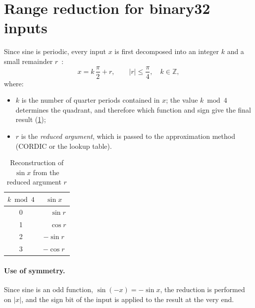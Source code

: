 \section{Range reduction for binary32 inputs}
\label{sec:range-reduction}

Since sine is periodic, every input $x$ is first decomposed into an integer
$k$ and a small remainder $r$~\cite{ly2026payne}:
\begin{equation}
  x = k\,\frac{\pi}{2} + r, \qquad |r| \le \frac{\pi}{4}, \quad k \in \mathbb{Z},
  \label{eq:sin-reduction}
\end{equation}
where:
\begin{itemize}
  \item $k$ is the number of quarter periods contained in $x$; the value
    $k \bmod 4$ determines the quadrant, and therefore which function and
    sign give the final result (\cref{tab:quadrant});
  \item $r$ is the \emph{reduced argument}, which is passed to the
    approximation method (CORDIC or the lookup table).
\end{itemize}

\begin{table}[H]
  \centering
  \caption{Reconstruction of $\sin x$ from the reduced argument $r$}
  \label{tab:quadrant}
  \begin{tabular}{cc}
    \toprule
    $k \bmod 4$ & $\sin x$ \\
    \midrule
    0 & $\phantom{-}\sin r$ \\
    1 & $\phantom{-}\cos r$ \\
    2 & $-\sin r$ \\
    3 & $-\cos r$ \\
    \bottomrule
  \end{tabular}
\end{table}

\paragraph{Use of symmetry.}
Since sine is an odd function, $\sin(-x) = -\sin x$, the reduction is
performed on $|x|$, and the sign bit of the input is applied to the result at
the very end.

